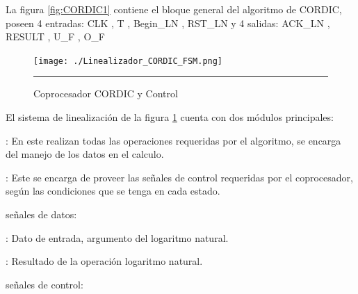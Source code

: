 La figura \ref{fig:CORDIC1} contiene el bloque general del algoritmo de CORDIC, poseen 4 entradas: CLK , T , Begin\_LN , RST\_LN y 4 salidas: ACK\_LN , RESULT , U\_F , O\_F

\begin{figure}[H]
  \centering
    \texttt{[image: ./Linealizador\_CORDIC\_FSM.png]}
    \rule{35em}{0.5pt}
  \caption[Coprocesador CORDIC y Control]{Coprocesador CORDIC y Control  }
  \label{fig:CORDIC2}
\end{figure}

El sistema de linealización de la figura \ref{fig:CORDIC2} cuenta con dos módulos principales: 

\begin{compactitem}

\item {}: En este realizan todas las operaciones requeridas por el algoritmo, se encarga del manejo de los datos en el calculo. 


\item {}: Este se encarga de proveer las señales de control requeridas por el coprocesador, según las condiciones que se tenga en cada estado.

\end{compactitem}

señales de datos: 

\begin{compactitem}

\item {}: Dato de entrada, argumento del logaritmo natural. 
\item {}: Resultado de la operación logaritmo natural.

\end{compactitem}

señales de control: 

